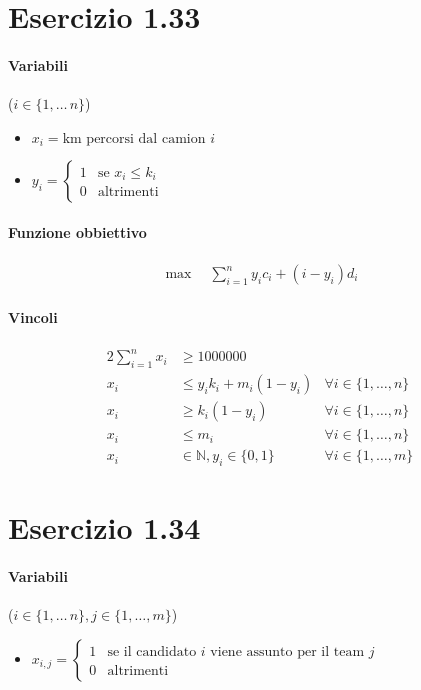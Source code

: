 \documentclass{article}
\begin{document}
\pagebreak
\section{Esercizio 1.33}

\paragraph{Variabili} ($i \in \{1,\ldots\,n\}$)
\begin{itemize}
  \item $x_i = \text{km percorsi dal camion }i$
  \item $y_i = \begin{cases}
    1 & \text{se }x_i \leq k_i \\
    0 & \text{altrimenti}
  \end{cases}$
\end{itemize}

\paragraph{Funzione obbiettivo}
\begin{align*}
  \max \quad \sum_{i=1}^n y_i c_i + (i-y_i) d_i
\end{align*}

\paragraph{Vincoli}
\begin{alignat}{2}
  \sum_{i=1}^n x_i &\geq 1000000 \quad & \\
  x_i &\leq y_i k_i + m_i(1-y_i) &\forall i \in \{1,\ldots,n\} \\
  x_i &\geq k_i(1-y_i)  &\forall i \in \{1,\ldots,n\} \\
  x_i &\leq m_i &\forall i \in \{1,\ldots,n\} \\
  x_i &\in \mathbb{N}, y_i \in \{0,1\} \quad &\forall i \in \{1,\ldots,m\}
\end{alignat}

\pagebreak
\section{Esercizio 1.34}

\paragraph{Variabili} ($i \in \{1,\ldots\,n\}, j \in \{1,\ldots,m\}$)
\begin{itemize}
  \item $x_{i,j} = \begin{cases}
    1 &\text{se il candidato }i\text{ viene assunto per il team }j\\
    0 &\text{altrimenti}
  \end{cases}$
\end{itemize}
\end{document}
